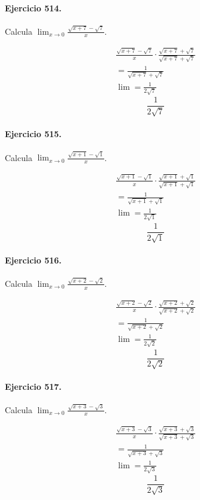 \documentclass[11pt,a4paper]{article}
\begin{document}
\paragraph{Ejercicio 514.} Calcula $\displaystyle\lim_{x\to0}\frac{\sqrt{x+7}-\sqrt{7}}{x}$.

\[
\begin{aligned}
\frac{\sqrt{x+7}-\sqrt{7}}{x}\cdot \frac{\sqrt{x+7}+\sqrt{7}}{\sqrt{x+7}+\sqrt{7}}\\
=\frac{1}{\sqrt{x+7}+\sqrt{7}}\\
\lim=\frac{1}{2\sqrt{7}}
\end{aligned}
\]
\[\boxed{\frac{1}{2\sqrt{7}}}\]


\paragraph{Ejercicio 515.} Calcula $\displaystyle\lim_{x\to0}\frac{\sqrt{x+1}-\sqrt{1}}{x}$.

\[
\begin{aligned}
\frac{\sqrt{x+1}-\sqrt{1}}{x}\cdot \frac{\sqrt{x+1}+\sqrt{1}}{\sqrt{x+1}+\sqrt{1}}\\
=\frac{1}{\sqrt{x+1}+\sqrt{1}}\\
\lim=\frac{1}{2\sqrt{1}}
\end{aligned}
\]
\[\boxed{\frac{1}{2\sqrt{1}}}\]


\paragraph{Ejercicio 516.} Calcula $\displaystyle\lim_{x\to0}\frac{\sqrt{x+2}-\sqrt{2}}{x}$.

\[
\begin{aligned}
\frac{\sqrt{x+2}-\sqrt{2}}{x}\cdot \frac{\sqrt{x+2}+\sqrt{2}}{\sqrt{x+2}+\sqrt{2}}\\
=\frac{1}{\sqrt{x+2}+\sqrt{2}}\\
\lim=\frac{1}{2\sqrt{2}}
\end{aligned}
\]
\[\boxed{\frac{1}{2\sqrt{2}}}\]


\paragraph{Ejercicio 517.} Calcula $\displaystyle\lim_{x\to0}\frac{\sqrt{x+3}-\sqrt{3}}{x}$.

\[
\begin{aligned}
\frac{\sqrt{x+3}-\sqrt{3}}{x}\cdot \frac{\sqrt{x+3}+\sqrt{3}}{\sqrt{x+3}+\sqrt{3}}\\
=\frac{1}{\sqrt{x+3}+\sqrt{3}}\\
\lim=\frac{1}{2\sqrt{3}}
\end{aligned}
\]
\[\boxed{\frac{1}{2\sqrt{3}}}\]
\end{document}
